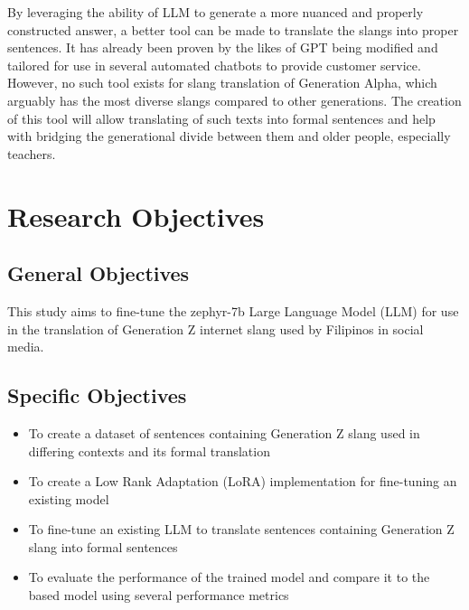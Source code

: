 By leveraging the ability of LLM to generate a more nuanced and properly constructed answer, a better tool can be made to translate the slangs into proper sentences.
It has already been proven by the likes of GPT being modified and tailored for use in several automated chatbots to provide customer service.
However, no such tool exists for slang translation of Generation Alpha, which arguably has the most diverse slangs compared to other generations.
The creation of this tool will allow translating of such texts into formal sentences and help with bridging the generational divide between them and older people, especially teachers. 

\section{Research Objectives}
\label{sec:research_objectives}

\subsection{General Objectives}
\label{sec:general_objectives}
This study aims to fine-tune the zephyr-7b Large Language Model (LLM) for use in the translation of Generation Z internet slang used by Filipinos in social media.
\subsection{Specific Objectives}
\label{sec:specific_objectives}
\begin{itemize}
	\item To create a dataset of sentences containing Generation Z slang used in differing contexts and its formal translation
	\item To create a Low Rank Adaptation (LoRA) implementation for fine-tuning an existing model
	\item To fine-tune an existing LLM to translate sentences containing Generation Z slang into formal sentences
	\item To evaluate the performance of the trained model and compare it to the based model using several performance metrics
\end{itemize}

